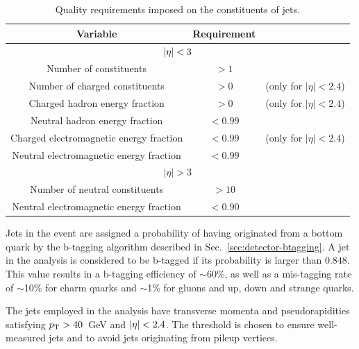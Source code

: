 
\begin{table}[ht!]
\centering
\begin{tabular}{ ccc }
Variable & Requirement & \\ \hline
\multicolumn{3}{c}{$|\eta| < 3$} \\ \hline    
Number of constituents & $>1$ &  \\
Number of charged constituents & $>0$ & (only for $|\eta| < 2.4$) \\
Charged hadron energy fraction & $>0$ & (only for $|\eta| < 2.4$) \\
Neutral hadron energy fraction & $<0.99$ &  \\
Charged electromagnetic energy fraction & $<0.99$ & (only for $|\eta| < 2.4$)\\
Neutral electromagnetic energy fraction & $<0.99$ &  \\
\hline
\multicolumn{3}{c}{$|\eta| > 3$} \\ \hline        
Number of neutral constituents & $>10$ &  \\
Neutral electromagnetic energy fraction & $<0.90$ &  \\
\end{tabular}
\caption{Quality requirements imposed on the constituents of jets.}
\label{tab:jet-id}
\end{table}

Jets in the event are assigned a probability of having originated from a bottom 
quark by the b-tagging %
algorithm described in Sec.~\ref{sec:detector-btagging}. A jet in the analysis 
is considered to be b-tagged if its probability is larger than $0.848$. This 
value results in a b-tagging efficiency of $\sim$60\%, as well as a mis-tagging 
rate of $\sim$10\% for charm quarks and $\sim$1\% for gluons and up, down and 
strange quarks.

The jets employed in the analysis have transverse momenta and pseudorapidities 
satisfying ${p_{\text T}}>40$~GeV and $|\eta|<2.4$. The \pt threshold is chosen to 
ensure well-measured jets and to avoid jets originating from pileup vertices.

